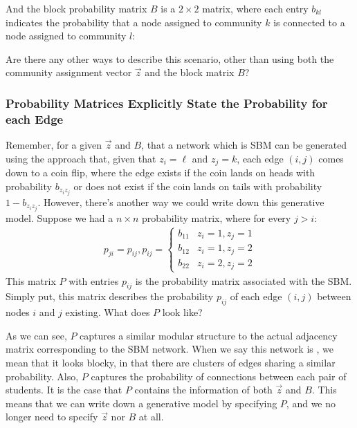 \documentclass[letterpaper,10pt,english]{jupyterBook}
\begin{document}
\sphinxAtStartPar
And the block probability matrix \(B\) is a \(2 \times 2\) matrix, where each entry \(b_{kl}\) indicates the probability that a node assigned to community \(k\) is connected to a node assigned to community \(l\):

\noindent{}

\sphinxAtStartPar
Are there any other ways to describe this scenario, other than using both the community assignment vector \(\vec z\) and the block matrix \(B\)?


\subsubsection{Probability Matrices Explicitly State the Probability for each Edge}
\label{\detokenize{representations/ch5/single-network-models_RDPG:probability-matrices-explicitly-state-the-probability-for-each-edge}}
\sphinxAtStartPar
Remember, for a given \(\vec z\) and \(B\), that a network which is SBM can be generated using the approach that, given that \(z_i = \ell\) and \(z_j = k\), each edge \((i, j)\) comes down to a coin flip, where the edge exists if the coin lands on heads with probability \(b_{z_i z_j}\) or does not exist if the coin lands on tails with probability \(1- b_{z_i z_j}\). However, there’s another way we could write down this generative model. Suppose we had a \(n \times n\) probability matrix, where for every \(j > i\):
\begin{align*}
    p_{ji} = p_{ij}, p_{ij} = \begin{cases}
        b_{11} & z_i = 1, z_j = 1 \\
        b_{12} & z_i = 1, z_j = 2 \\
        b_{22} & z_i = 2, z_j = 2
    \end{cases}
\end{align*}
\sphinxAtStartPar
This matrix \(P\) with entries \(p_{ij}\) is the probability matrix associated with the SBM. Simply put, this matrix describes the probability \(p_{ij}\) of each edge \((i,j)\) between nodes \(i\) and \(j\) existing. What does \(P\) look like?

\noindent{}

\sphinxAtStartPar
As we can see, \(P\) captures a similar modular structure to the actual adjacency matrix corresponding to the SBM network. When we say this network is , we mean that it looks block\sphinxhyphen{}y, in that there are clusters of edges sharing a similar probability. Also, \(P\) captures the probability of connections between each pair of students. It is the case that \(P\) contains the information of both \(\vec z\) and \(B\). This means that we can write down a generative model by specifying  \(P\), and we no longer need to specify \(\vec z\) nor \(B\) at all.
\end{document}
